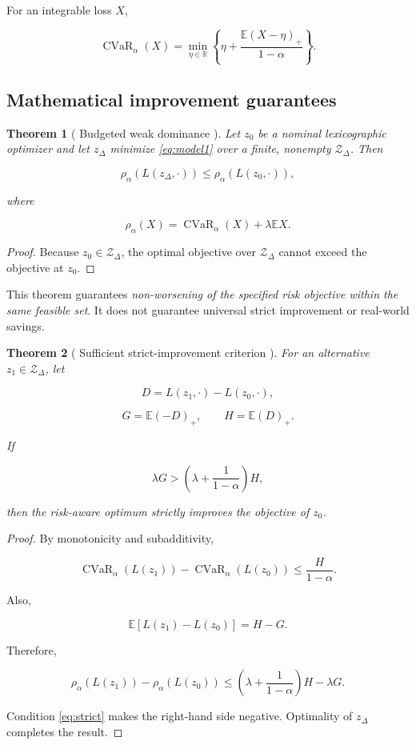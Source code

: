 \documentclass[10pt,a4paper]{article}
\DeclareMathOperator{\CVaR}{CVaR}
\newcommand{\RR}{\mathbb{R}}
\newcommand{\EE}{\mathbb{E}}
\theoremstyle{plain}
\newtheorem{theorem}{Theorem}[section]
\theoremstyle{definition}
\theoremstyle{remark}
\begin{document}
For an integrable loss \(X\),

\begin{equation}
\CVaR_\alpha(X)
=
\min_{\eta\in\RR}
\left\{
\eta+
\frac{\EE(X-\eta)_+}{1-\alpha}
\right\}.
\label{eq:cvar}
\end{equation}

\subsection{Mathematical improvement guarantees}

\begin{theorem}[
Budgeted weak dominance
\cite{relaymodel1}
]
Let \(z_0\) be a nominal lexicographic
optimizer and let \(z_\Delta\)
minimize \eqref{eq:model1} over a finite,
nonempty \(\mathcal Z_\Delta\).
Then

\[
\rho_\alpha(L(z_\Delta,\cdot))
\leq
\rho_\alpha(L(z_0,\cdot)),
\]

where

\[
\rho_\alpha(X)=
\CVaR_\alpha(X)+\lambda\EE X.
\]
\end{theorem}

\begin{proof}
Because \(z_0\in\mathcal Z_\Delta\),
the optimal objective over
\(\mathcal Z_\Delta\) cannot exceed
the objective at \(z_0\).
\end{proof}

This theorem guarantees
\emph{non-worsening of the specified
risk objective within the same feasible set}.
It does not guarantee universal strict
improvement or real-world savings.

\begin{theorem}[
Sufficient strict-improvement criterion
\cite{relaymodel1}
]
For an alternative \(z_1\in\mathcal Z_\Delta\),
let

\[
D=L(z_1,\cdot)-L(z_0,\cdot),
\]

\[
G=\EE(-D)_+,
\qquad
H=\EE(D)_+.
\]

If

\begin{equation}
\lambda G>
\left(
\lambda+\frac{1}{1-\alpha}
\right)H,
\label{eq:strict}
\end{equation}

then the risk-aware optimum strictly improves
the objective of \(z_0\).
\end{theorem}

\begin{proof}
By monotonicity and subadditivity,

\[
\CVaR_\alpha(L(z_1))
-
\CVaR_\alpha(L(z_0))
\leq
\frac{H}{1-\alpha}.
\]

Also,

\[
\EE[L(z_1)-L(z_0)]=H-G.
\]

Therefore,

\[
\rho_\alpha(L(z_1))
-
\rho_\alpha(L(z_0))
\leq
\left(
\lambda+\frac{1}{1-\alpha}
\right)H-\lambda G.
\]

Condition \eqref{eq:strict}
makes the right-hand side negative.
Optimality of \(z_\Delta\) completes the result.
\end{proof}
\end{document}
